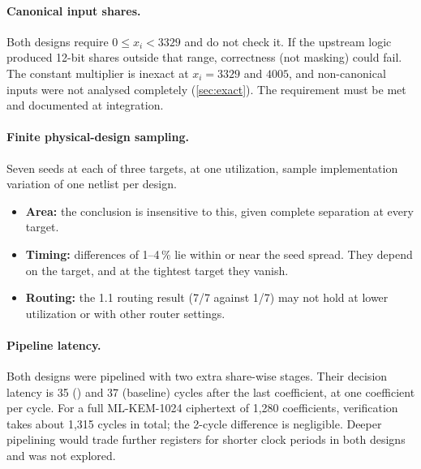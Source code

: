 \paragraph{Canonical input shares.} Both designs require $0 \le x_i < 3329$ and do not check it. If the upstream logic produced 12-bit shares outside that range, correctness (not masking) could fail. The constant multiplier is inexact at $x_i = 3329$ and $4005$, and non-canonical inputs were not analysed completely (\cref{sec:exact}). The requirement must be met and documented at integration.

\paragraph{Finite physical-design sampling.} Seven seeds at each of three targets, at one utilization, sample implementation variation of one netlist per design.
\begin{itemize}
  \item \textbf{Area:} the conclusion is insensitive to this, given complete separation at every target.
  \item \textbf{Timing:} differences of 1--4\,\% lie within or near the seed spread. They depend on the target, and at the tightest target they vanish.
  \item \textbf{Routing:} the 1.1\ns{} routing result (7/7 against 1/7) may not hold at lower utilization or with other router settings.
\end{itemize}

\paragraph{Pipeline latency.} Both designs were pipelined with two extra share-wise stages. Their decision latency is 35 (\PAMS{}) and 37 (baseline) cycles after the last coefficient, at one coefficient per cycle. For a full ML-KEM-1024 ciphertext of 1,280 coefficients, verification takes about 1,315 cycles in total; the 2-cycle difference is negligible. Deeper pipelining would trade further registers for shorter clock periods in both designs and was not explored.

